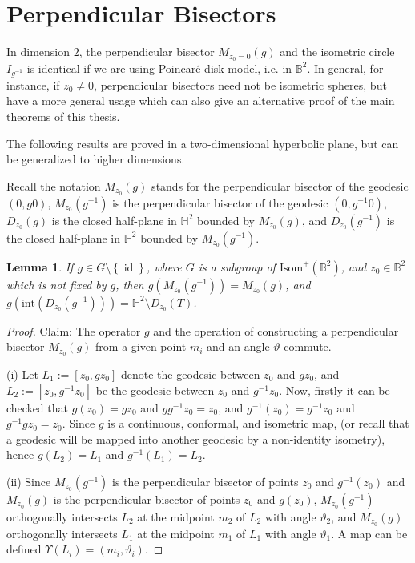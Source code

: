 \documentclass[12pt,oneside]{sfsuthesis}
\theoremstyle{plain} %
\newtheorem{lemma}[theorem]{Lemma}
\theoremstyle{definition}  %
\theoremstyle{remark}  %
\theoremstyle{plain}
\DeclareMathOperator{\id}{id}
\begin{document}
{\section{Perpendicular Bisectors}

In dimension $2$, the perpendicular bisector $M_{z_0=0}(g)$ and the isometric circle $I_{g^{-1}}$ is identical if we are using Poincar\'{e} disk model, i.e. in $\mathbb{B}^2$. In general, for instance, if $z_0\neq 0$, perpendicular bisectors need not be isometric spheres, but have a more general usage which can also give an alternative proof of the main theorems of this thesis.

The following results are proved in a two-dimensional hyperbolic plane, but can be generalized to higher dimensions.


Recall the notation $M_{z_0}(g)$ stands for the perpendicular bisector of the geodesic $(0,g0)$, $M_{z_0}(g^{-1})$ is the perpendicular bisector of the geodesic $(0,g^{-1}0)$, $D_{z_0}(g)$ is the closed half-plane in $\mathbb{H}^2$ bounded by $M_{z_0}(g)$, and $D_{z_0}(g^{-1})$ is the closed half-plane in $\mathbb{H}^2$ bounded by $M_{z_0}(g^{-1})$.

\begin{lemma}\label{bounded closed half-plane}\label{matryoshka}
If $g\in G\setminus \left\lbrace \id\right\rbrace$, where $G$ is a subgroup of $\text{Isom}^+(\mathbb{B}^2)$, and $z_0\in\mathbb{B}^2$ which is not fixed by $g$, then $g(M_{z_0}(g^{-1}))=M_{z_0}(g)$, and $g(\text{int}(D_{z_0}(g^{-1})))=\mathbb{H}^2\setminus D_{z_0}(T)$. 
\end{lemma}

\begin{proof}
Claim: The operator $g$ and the operation of constructing a perpendicular bisector $M_{z_0}(g)$ from a given point $m_i$ and an angle $\vartheta$ commute.

(i) Let $L_1:=[z_0,gz_0]$ denote the geodesic between $z_0$ and $gz_0$, and $L_2:=[z_0,g^{-1}z_0]$ be the geodesic between $z_0$ and $g^{-1}z_0$. Now, firstly it can be checked that $g(z_0)=gz_0$ and $gg^{-1}z_0=z_0$, and $g^{-1}(z_0)=g^{-1}z_0$ and $g^{-1}gz_0=z_0.$ Since $g$ is a continuous, conformal, and isometric map, (or recall that a geodesic will be mapped into another geodesic by a non-identity isometry), hence $g(L_2)=L_1$ and $g^{-1}(L_1)=L_2$.

(ii) Since $M_{z_0}(g^{-1})$ is the perpendicular bisector of points $z_0$ and $g^{-1}(z_0)$  and $M_{z_0}(g)$ is the perpendicular bisector of points $z_0$ and $g(z_0)$, $M_{z_0}(g^{-1})$ orthogonally intersects $L_2$ at the midpoint $m_2$ of $L_2$ with angle $\vartheta_2$, and $M_{z_0}(g)$ orthogonally intersects $L_1$ at the midpoint $m_1$ of $L_1$ with angle $\vartheta_1$. A map can be defined $\Upsilon(L_i)=(m_i,\vartheta_i)$.


\end{proof}}
\end{document}
